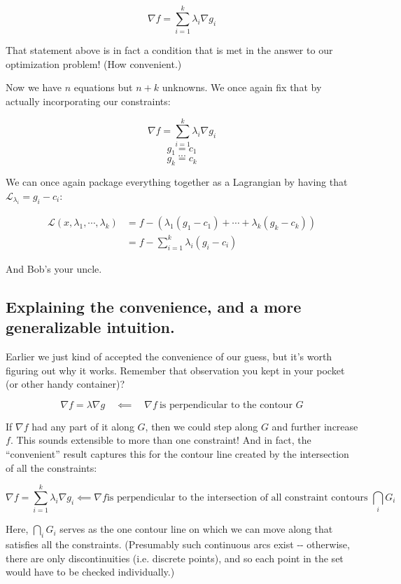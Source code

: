 \documentclass[letterpaper,12pt]{report}
\begin{document}
\[ \nabla f = \sum_{i=1}^k \lambda _i \nabla g_i \]

That statement above is in fact a condition that is met in the answer to
our optimization problem! (How convenient.)

Now we have \(n\) equations but \(n+k\) unknowns. We once again fix that
by actually incorporating our constraints:

\[ \nabla f = \sum_{i=1}^k \lambda _i \nabla g_i \] \[ g_1 = c_1 \]
\[ ... \] \[ g_k = c_k \]

We can once again package everything together as a Lagrangian by having
that \(\mathcal{L}_{\lambda _i} = g_i - c_i\):

\[\begin{split} \mathcal{L}(x, \lambda _1, \cdots, \lambda _k) &= 
                                            f - (\lambda _1 (g_1 - c_1) + \cdots + \lambda _k (g_k - c_k) ) \\
                     &= f - \sum_{i=1}^k \lambda _i (g_i - c_i) \end{split}\]

And Bob's your uncle.

\subsection{Explaining the convenience, and a more generalizable intuition.}\label{explaining-the-convenience}

Earlier we just kind of accepted the convenience of our guess, but it's
worth figuring out why it works. Remember that observation you kept in
your pocket (or other handy container)?

\[\nabla f = \lambda \nabla g \quad \impliedby \quad \nabla f \ \text{is perpendicular to the contour } G \]

If \(\nabla f\) had any part of it along \(G\), then we could step along
\(G\) and further increase \(f\). This sounds extensible to more than
one constraint! And in fact, the ``convenient'' result captures this for
the contour line created by the intersection of all the constraints:

\[
  \nabla f = \sum_{i=1}^k \lambda _i \nabla g_i  \impliedby
  \nabla f \text{is perpendicular to the intersection
  of all constraint contours } \bigcap _i G_i 
\]

Here, \(\bigcap _i G_i\) serves as the one contour line on which we can
move along that satisfies all the constraints. (Presumably such
continuous arcs exist -\/- otherwise, there are only discontinuities
(i.e. discrete points), and so each point in the set would have to be
checked individually.)
\end{document}
